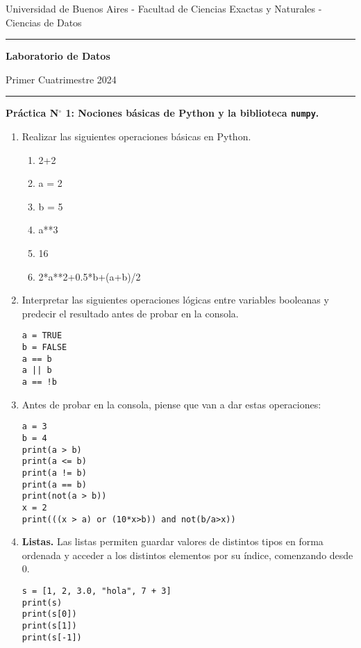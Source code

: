 \documentclass[a4paper,11pt]{article}
\theoremstyle{definition}
\begin{document}
\centerline{{\small Universidad de Buenos Aires - Facultad de Ciencias Exactas y Naturales - Ciencias de Datos}}

\vskip 0.2cm

\hrule

\vskip 0.2cm

 \centerline{{\bf\Large{\sc Laboratorio de Datos}}}

 \vskip 0.2cm

 \centerline{\ttfamily Primer Cuatrimestre 2024}

\vskip 0.2cm

 \hrule

 \bigskip
 \centerline{\bf Práctica N$^\circ$ 1: Nociones básicas de Python y la biblioteca \lstinline{numpy}.}
 \bigskip

\begin{enumerate}
\item
Realizar las siguientes operaciones básicas en Python.
\begin{enumerate}
\item 2+2
\item a = 2
\item b = 5
\item a**3
\item 16 %
\item 2*a**2+0.5*b+(a+b)/2
\end{enumerate}

\item Interpretar las siguientes operaciones lógicas entre variables booleanas y predecir el resultado antes de probar en la consola.
\begin{lstlisting}
a = TRUE
b = FALSE
a == b
a || b
a == !b
\end{lstlisting}

\item Antes de probar en la consola, piense que van a dar estas operaciones:
\begin{lstlisting}
a = 3
b = 4
print(a > b)
print(a <= b)
print(a != b)
print(a == b)
print(not(a > b))
x = 2
print(((x > a) or (10*x>b)) and not(b/a>x))
\end{lstlisting}

\item \textbf{Listas.}
Las listas permiten guardar valores de distintos tipos en forma ordenada y acceder a los distintos elementos por su índice, comenzando desde 0.
\begin{lstlisting}
s = [1, 2, 3.0, "hola", 7 + 3]
print(s)
print(s[0])
print(s[1])
print(s[-1])
\end{lstlisting}



\end{enumerate}
\end{document}
